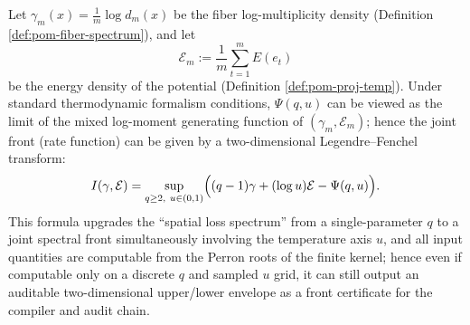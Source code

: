 \begin{remark}\label{rem:pom-psi-2d-legendre-front}
Let \(\gamma_m(x)=\frac{1}{m}\log d_m(x)\) be the fiber log-multiplicity density (Definition \ref{def:pom-fiber-spectrum}), and let
\[
\mathcal{E}_m:=\frac{1}{m}\sum_{t=1}^m E(e_t)
\]
be the energy density of the potential (Definition \ref{def:pom-proj-temp}).
Under standard thermodynamic formalism conditions, \(\Psi(q,u)\) can be viewed as the limit of the mixed log-moment generating function of \((\gamma_m,\mathcal{E}_m)\); hence the joint front (rate function) can be given by a two-dimensional Legendre--Fenchel transform:
\[
I(\gamma,\mathcal{E})
=\sup_{q\ge 2,\ u\in(0,1)}
\Bigl((q-1)\gamma+(\log u)\mathcal{E}-\Psi(q,u)\Bigr).
\]
This formula upgrades the ``spatial loss spectrum'' from a single-parameter \(q\) to a joint spectral front simultaneously involving the temperature axis \(u\), and all input quantities are computable from the Perron roots of the finite kernel; hence even if computable only on a discrete \(q\) and sampled \(u\) grid, it can still output an auditable two-dimensional upper/lower envelope as a front certificate for the compiler and audit chain.
\end{remark}

